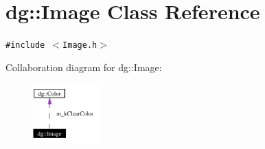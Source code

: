 \section{dg::Image Class Reference}
\label{classdg_1_1Image}
{\tt \#include $<$Image.h$>$}

Collaboration diagram for dg::Image:\begin{figure}[H]
\begin{center}
\leavevmode
\includegraphics[width=75pt]{classdg_1_1Image__coll__graph}
\end{center}
\end{figure}
